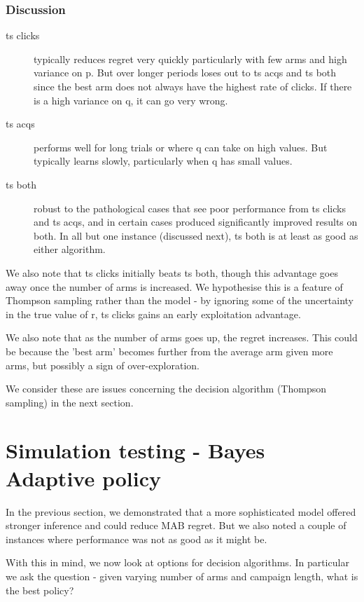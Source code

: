 \documentclass[11pt,a4,singlespacing,titlepagenumber=on]{scrreprt}
\numberwithin{equation}{chapter} %
\theoremstyle{remark}
\begin{document}
\subsection{Discussion}

\begin{description}
	\item[ts clicks] typically reduces regret very quickly particularly with few arms and high variance on p. But over longer periods loses out to ts acqs and ts both since the best arm does not always have the highest rate of clicks. If there is a high variance on q, it can go very wrong.
	\item[ts acqs] performs well for long trials or where q can take on high values. But typically learns slowly, particularly when q has small values.
	\item[ts both] robust to the pathological cases that see poor performance from ts clicks and ts acqs, and in certain cases produced significantly improved results on both. In all but one instance (discussed next), ts both is at least as good as either algorithm.

\end{description}

We also note that ts clicks initially beats ts both, though this advantage goes away once the number of arms is increased. We hypothesise this is a feature of Thompson sampling rather than the model - by ignoring some of the uncertainty in the true value of r, ts clicks gains an early exploitation advantage.

We also note that as the number of arms goes up, the regret increases. This could be because the 'best arm' becomes further from the average arm given more arms, but possibly a sign of over-exploration.

We consider these are issues concerning the decision algorithm (Thompson sampling) in the next section.

\pagebreak

\chapter{Simulation testing - Bayes Adaptive policy}

In the previous section, we demonstrated that a more sophisticated model offered stronger inference and could reduce MAB regret. But we also noted a couple of instances where performance was not as good as it might be. 

With this in mind, we now look at options for decision algorithms. In particular we ask the question - given varying number of arms and campaign length, what is the best policy? 
\end{document}
